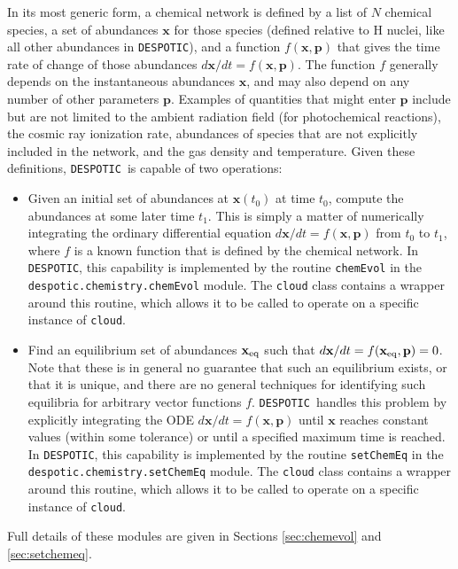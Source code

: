 \documentclass[12pt]{article}
\newcommand{\despotic}{\texttt{DESPOTIC}}
\begin{document}
In its most generic form, a chemical network is defined by a list of $N$ chemical species, a set of abundances $\mathbf{x}$ for those species (defined relative to H nuclei, like all other abundances in \despotic), and a function $f(\mathbf{x},\mathbf{p})$ that gives the time rate of change of those abundances $d\mathbf{x}/dt = f(\mathbf{x},\mathbf{p})$. The function $f$ generally depends on the instantaneous abundances $\mathbf{x}$, and may also depend on any number of other parameters $\mathbf{p}$. Examples of quantities that might enter $\mathbf{p}$ include but are not limited to the ambient radiation field (for photochemical reactions), the cosmic ray ionization rate, abundances of species that are not explicitly included in the network, and the gas density and temperature. Given these definitions, \despotic\ is capable of two operations:
\begin{itemize}
\item Given an initial set of abundances at $\mathbf{x}(t_0)$ at time $t_0$, compute the abundances at some later time $t_1$. This is simply a matter of numerically integrating the ordinary differential equation $d\mathbf{x}/dt = f(\mathbf{x},\mathbf{p})$ from $t_0$ to $t_1$, where $f$ is a known function that is defined by the chemical network. In \despotic, this capability is implemented by the routine \verb=chemEvol= in the \verb=despotic.chemistry.chemEvol= module. The \verb=cloud= class contains a wrapper around this routine, which allows it to be called to operate on a specific instance of \verb=cloud=.
\item Find an equilibrium set of abundances $\mathbf{x}_{\rm eq}$ such that $d\mathbf{x}/dt = f(\mathbf{x}_{\rm eq},\mathbf{p}) = 0$. Note that these is in general no guarantee that such an equilibrium exists, or that it is unique, and there are no general techniques for identifying such equilibria for arbitrary vector functions $f$. \despotic\ handles this problem by explicitly integrating the ODE $d\mathbf{x}/dt = f(\mathbf{x},\mathbf{p})$ until $\mathbf{x}$ reaches constant values (within some tolerance) or until a specified maximum time is reached. In \despotic, this capability is implemented by the routine \verb=setChemEq= in the \verb=despotic.chemistry.setChemEq= module. The \verb=cloud= class contains a wrapper around this routine, which allows it to be called to operate on a specific instance of \verb=cloud=.
\end{itemize}
Full details of these modules are given in Sections \ref{sec:chemevol} and \ref{sec:setchemeq}.
\end{document}
